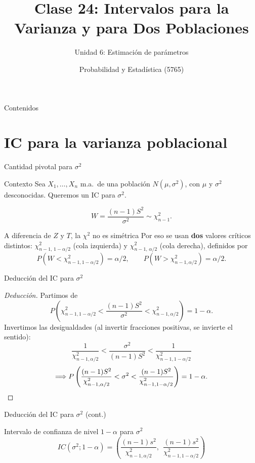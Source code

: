 \documentclass[aspectratio=169,11pt]{beamer}
\title[Prob. y Estadística]{Clase 24: Intervalos para la Varianza y para Dos Poblaciones}
\subtitle{Unidad 6: Estimación de parámetros}
\institute[UNS]{Universidad Nacional del Sur \\ Departamento de Matemática}
\author{Probabilidad y Estadística (5765)}
\date{}
\begin{document}
\begin{frame}
\titlepage
\end{frame}

\begin{frame}{Contenidos}
\tableofcontents
\end{frame}

\section{IC para la varianza poblacional}

\begin{frame}{Cantidad pivotal para $\sigma^2$}
\begin{block}{Contexto}
Sea $X_1,\dots,X_n$ m.a.\ de una población $N(\mu,\sigma^2)$, con $\mu$ y $\sigma^2$ desconocidas. Queremos un IC para $\sigma^2$.
\end{block}

\begin{theorem}
\[
W = \frac{(n-1)S^2}{\sigma^2} \sim \chi^2_{n-1}.
\]
\end{theorem}

\begin{block}{A diferencia de $Z$ y $T$, la $\chi^2$ no es simétrica}
Por eso se usan \textbf{dos} valores críticos distintos: $\chi^2_{n-1,\,1-\alpha/2}$ (cola izquierda) y $\chi^2_{n-1,\,\alpha/2}$ (cola derecha), definidos por
\[
P(W < \chi^2_{n-1,1-\alpha/2}) = \alpha/2, \qquad P(W > \chi^2_{n-1,\alpha/2}) = \alpha/2.
\]
\end{block}
\end{frame}

\begin{frame}{Deducción del IC para $\sigma^2$}
\begin{proof}[Deducción]
Partimos de
\[
P\left(\chi^2_{n-1,1-\alpha/2} < \frac{(n-1)S^2}{\sigma^2} < \chi^2_{n-1,\alpha/2}\right) = 1-\alpha.
\]
Invertimos las desigualdades (al invertir fracciones positivas, se invierte el sentido):
\[
\frac{1}{\chi^2_{n-1,\alpha/2}} < \frac{\sigma^2}{(n-1)S^2} < \frac{1}{\chi^2_{n-1,1-\alpha/2}}
\]
\[
\Longrightarrow P\left(\frac{(n-1)S^2}{\chi^2_{n-1,\alpha/2}} < \sigma^2 < \frac{(n-1)S^2}{\chi^2_{n-1,1-\alpha/2}}\right) = 1-\alpha. \qedhere
\]
\end{proof}

\end{frame}

\begin{frame}{Deducción del IC para $\sigma^2$ (cont.)}
\begin{alertblock}{Intervalo de confianza de nivel $1-\alpha$ para $\sigma^2$}
\[
IC(\sigma^2;1-\alpha) = \left(\frac{(n-1)s^2}{\chi^2_{n-1,\alpha/2}},\ \ \frac{(n-1)s^2}{\chi^2_{n-1,1-\alpha/2}}\right)
\]
\end{alertblock}
\end{frame}
\end{document}

